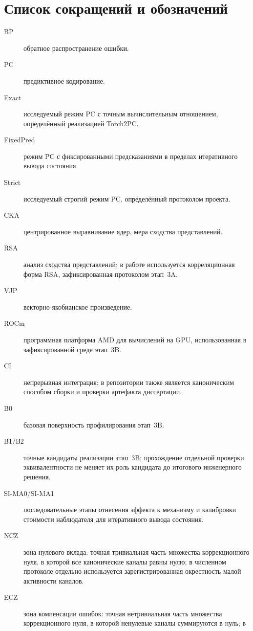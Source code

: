 \chapter*{Список сокращений и обозначений}

\begin{description}
  \item[BP] обратное распространение ошибки.
  \item[PC] предиктивное кодирование.
  \item[Exact] исследуемый режим PC с точным вычислительным отношением,
    определённый реализацией Torch2PC.
  \item[FixedPred] режим PC с фиксированными предсказаниями в пределах
    итеративного вывода состояния.
  \item[Strict] исследуемый строгий режим PC, определённый протоколом проекта.
  \item[CKA] центрированное выравнивание ядер, мера сходства представлений.
  \item[RSA] анализ сходства представлений; в работе используется
    корреляционная форма RSA, зафиксированная протоколом этап~3A.
  \item[VJP] векторно-якобианское произведение.
  \item[ROCm] программная платформа AMD для вычислений на GPU, использованная
    в зафиксированной среде этап~3B.
  \item[CI] непрерывная интеграция; в репозитории также является каноническим
    способом сборки и проверки артефакта диссертации.
  \item[B0] базовая поверхность профилирования этап~3B.
  \item[B1/B2] точные кандидаты реализации этап~3B; прохождение отдельной
    проверки эквивалентности не меняет их роль кандидата до итогового
    инженерного решения.
  \item[SI-MA0/SI-MA1] последовательные этапы отнесения эффекта к механизму и
    калибровки стоимости наблюдателя для итеративного вывода состояния.
  \item[NCZ] зона нулевого вклада: точная тривиальная часть множества
    коррекционного нуля, в которой все канонические каналы равны нулю; в
    численном протоколе отдельно используется зарегистрированная окрестность
    малой активности каналов.
  \item[ECZ] зона компенсации ошибок: точная нетривиальная часть множества
    коррекционного нуля, в которой ненулевые каналы суммируются в нуль; в

\end{description}
